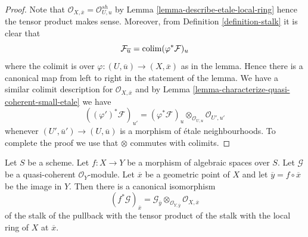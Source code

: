 \begin{proof}
Note that $\mathcal{O}_{X, \overline{x}} = \mathcal{O}_{U, u}^{sh}$ by
Lemma \ref{lemma-describe-etale-local-ring}
hence the tensor product makes sense. Moreover, from
Definition \ref{definition-stalk}
it is clear that
$$
\mathcal{F}_{\overline{u}} = \mathop{\mathrm{colim}}\nolimits (\varphi^*\mathcal{F})_u
$$
where the colimit is over $\varphi : (U, \overline{u}) \to (X, \overline{x})$
as in the lemma. Hence there is a canonical map from left to right in
the statement of the lemma. We have a similar colimit description for
$\mathcal{O}_{X, \overline{x}}$
and by
Lemma \ref{lemma-characterize-quasi-coherent-small-etale}
we have
$$
((\varphi')^*\mathcal{F})_{u'} =
(\varphi^*\mathcal{F})_u \otimes_{\mathcal{O}_{U, u}} \mathcal{O}_{U', u'}
$$
whenever $(U', \overline{u}') \to (U, \overline{u})$ is a morphism of
\'etale neighbourhoods. To complete the proof we use that
$\otimes$ commutes with colimits.
\end{proof}

\begin{lemma}
\label{lemma-stalk-pullback-quasi-coherent}
Let $S$ be a scheme. Let $f : X \to Y$ be a morphism of algebraic spaces
over $S$. Let $\mathcal{G}$ be a quasi-coherent $\mathcal{O}_Y$-module.
Let $\overline{x}$ be a geometric point of $X$ and let
$\overline{y} = f \circ \overline{x}$ be the image in $Y$.
Then there is a canonical isomorphism
$$
(f^*\mathcal{G})_{\overline{x}} =
\mathcal{G}_{\overline{y}} \otimes_{\mathcal{O}_{Y, \overline{y}}}
\mathcal{O}_{X, \overline{x}}
$$
of the stalk of the pullback with the tensor product of the stalk
with the local ring of $X$ at $\overline{x}$.
\end{lemma}

